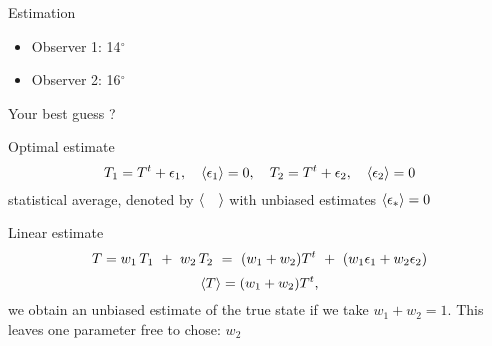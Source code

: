 \begin{frame}{Estimation}
\begin{itemize}
\item
Observer 1: 14$^\circ$
\item
Observer 2: 16$^\circ$
\end{itemize}

\centerline{Your best guess ?}

\end{frame}


\begin{frame}{Optimal estimate}
\begin{equation}
T_1 = {T}^t+\epsilon_1, \quad \left\langle \epsilon_1 \right\rangle = 0, \quad T_2 = {T}^t+\epsilon_2, \quad \left\langle \epsilon_2 \right\rangle = 0
\end{equation}
statistical average, denoted by $\left\langle \quad \right\rangle$ with unbiased estimates $\left\langle \epsilon_* \right\rangle=0$

Linear estimate
\begin{equation}
{T}=w_1 \, T_1 ~+~ w_2 \, T_2 ~=~ (w_1+w_2) {T}^t ~+~ (w_1 \epsilon_1 + w_2 \epsilon_2)
\end{equation}
\begin{equation}
\left\langle {T} \right\rangle = (w_1+w_2) {T}^t,
\end{equation}
we obtain an unbiased estimate of the true state if we take $w_1+w_2=1$. This leaves one parameter free to chose: $w_2$
\begin{center}
\end{center}
\end{frame}


